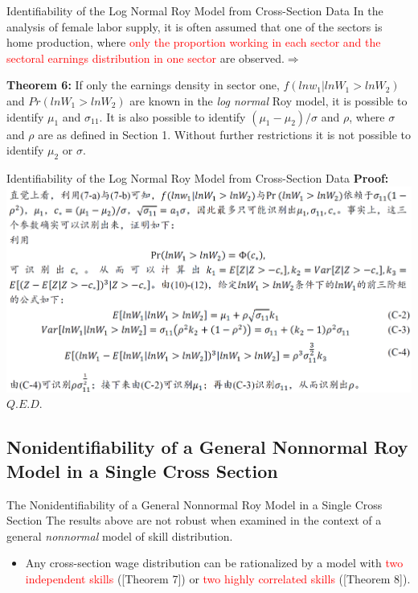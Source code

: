 \documentclass{beamer}
\begin{document}
\begin{frame}{Identifiability of the Log Normal Roy Model from Cross-Section Data}
	In the analysis of female labor supply, it is often assumed that one of the sectors is home production, where \textcolor{red}{only the proportion working in each sector and the sectoral earnings distribution in one sector} are observed.$\Rightarrow$
	\bigskip

	\textbf{Theorem 6:}	If only the earnings density in sector one, $f(lnw_1 |lnW_1>lnW_2)$ and $Pr(lnW_1>lnW_2)$ are known in the \textit{log normal} Roy model, it is possible to identify $\mu_1$ and $\sigma_{11}$. It is also possible to identify $(\mu_1-\mu_2)/\sigma$ and $\rho$, where $\sigma$ and $\rho$ are as defined in Section 1. Without further restrictions it is not possible to identify $\mu_2$ or $\sigma$.
\end{frame}
\begin{frame}{Identifiability of the Log Normal Roy Model from Cross-Section Data}
	\textbf{Proof:}
	\includegraphics[scale=0.5]{theorem6}
\hfill $Q.E.D.$
\end{frame}

\subsection{Nonidentifiability of a General Nonnormal Roy Model in a Single Cross Section}
\begin{frame}{The Nonidentifiability of a General Nonnormal Roy Model in a Single Cross Section}
	The results above are not robust when examined in the context of a general \textit{nonnormal} model of skill distribution.
	\medskip
	\pause
	\begin{itemize}
		\item Any cross-section wage distribution can be rationalized by a model with \textcolor{red}{two independent skills} ([Theorem 7]) or \textcolor{red}{two highly correlated skills} ([Theorem 8]). 
	\end{itemize}
\end{frame}
\end{document}
